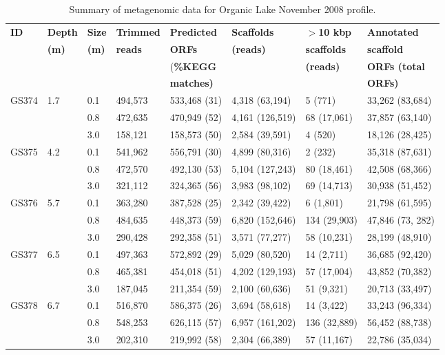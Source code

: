 \begin{table}
\footnotesize
\caption[Summary of metagenomic data for Organic Lake profile]{Summary of metagenomic data for Organic Lake November 2008 profile.}
\label{tab:metag}
\smallskip
\begin{tabularx}{\textwidth}{p{0.7cm}p{0.7cm}p{0.5cm}p{1.1cm}p{1.8cm}p{2.2cm}p{1.9cm}X}
\toprule
\textbf{ID} & \textbf{Depth} & \textbf{Size}         & \textbf{Trimmed}      & \textbf{Predicted}    & \textbf{Scaffolds} & \textbf{$>$10 kbp} & \textbf{Annotated} \\
            & \textbf{(m)}   & \textbf{(\textmu{}m)} & \textbf{reads}        & \textbf{\acp{ORF}}    & \textbf{(reads)}   & \textbf{scaffolds} & \textbf{scaffold} \\
            &                &                       &                       & (\textbf{\%\ac{KEGG}} &                    & \textbf{(reads)}   & \textbf{\acp{ORF} (total} \\
            &                &                       &                       & \textbf{matches)}     &                    &                    & \textbf{\acp{ORF}) } \\
\midrule
GS374 & 1.7 & 0.1 & 494,573 & 533,468 (31) & 4,318 (63,194) & 5 (771) & 33,262 (83,684)\\
 &  & 0.8 & 472,635 & 470,949 (52) & 4,161 (126,519) & 68 (17,061) & 37,857 (63,140)\\
 &  & 3.0 & 158,121 & 158,573 (50) & 2,584 (39,591) & 4 (520) & 18,126 (28,425)\\
GS375 & 4.2 & 0.1 & 541,962 & 556,791 (30) & 4,899 (80,316) & 2 (232) & 35,318 (87,631)\\
 &  & 0.8 & 472,570 & 492,130 (53) & 5,104 (127,243) & 80 (18,461) & 42,508 (68,366)\\
 &  & 3.0 & 321,112 & 324,365 (56) & 3,983 (98,102) & 69 (14,713) & 30,938 (51,452)\\
GS376 & 5.7 & 0.1 & 363,280 & 387,528 (25) & 2,342 (39,422) & 6 (1,801) & 21,798 (61,595)\\
 &  & 0.8 & 484,635 & 448,373 (59) & 6,820 (152,646) & 134 (29,903) & 47,846 (73, 282)\\
 &  & 3.0 & 290,428 & 292,358 (51) & 3,571 (77,277) & 58 (10,231) & 28,199 (48,910)\\
GS377 & 6.5 & 0.1 & 497,363 & 572,892 (29) & 5,029 (80,520) & 14 (2,711) & 36,685 (92,420)\\
 &  & 0.8 & 465,381 & 454,018 (51) & 4,202 (129,193) & 57 (17,004) & 43,852 (70,382)\\
 &  & 3.0 & 187,045 & 211,354 (59) & 2,100 (60,636) & 51 (9,321) & 20,713 (33,497)\\
GS378 & 6.7 & 0.1 & 516,870 & 586,375 (26) & 3,694 (58,618) & 14 (3,422) & 33,243 (96,334)\\
 &  & 0.8 & 548,253 & 626,115 (57) & 6,957 (161,202) & 136 (32,889) & 56,452 (88,738)\\
 &  & 3.0 & 202,310 & 219,992 (58) & 2,304 (66,389) & 57 (11,167) & 22,786 (35,034)\\
\bottomrule
\end{tabularx}
\end{table}
